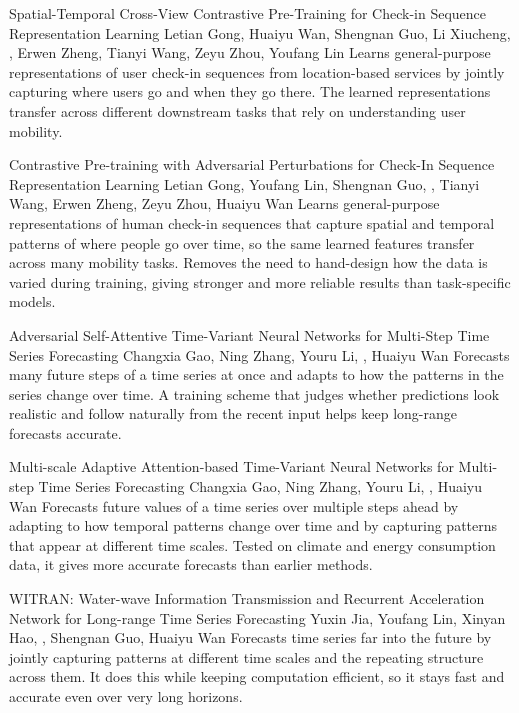 {Spatial-Temporal Cross-View Contrastive Pre-Training for Check-in Sequence Representation Learning}
{Letian Gong, Huaiyu Wan, Shengnan Guo, Li Xiucheng, \me, Erwen Zheng, Tianyi Wang, Zeyu Zhou, Youfang Lin}
{Learns general-purpose representations of user check-in sequences from location-based services by jointly capturing where users go and when they go there. The learned representations transfer across different downstream tasks that rely on understanding user mobility.}

{Contrastive Pre-training with Adversarial Perturbations for Check-In Sequence Representation Learning}
{Letian Gong, Youfang Lin, Shengnan Guo, \me, Tianyi Wang, Erwen Zheng, Zeyu Zhou, Huaiyu Wan}
{Learns general-purpose representations of human check-in sequences that capture spatial and temporal patterns of where people go over time, so the same learned features transfer across many mobility tasks. Removes the need to hand-design how the data is varied during training, giving stronger and more reliable results than task-specific models.}

{Adversarial Self-Attentive Time-Variant Neural Networks for Multi-Step Time Series Forecasting}
{Changxia Gao, Ning Zhang, Youru Li, \me, Huaiyu Wan}
{Forecasts many future steps of a time series at once and adapts to how the patterns in the series change over time. A training scheme that judges whether predictions look realistic and follow naturally from the recent input helps keep long-range forecasts accurate.}

{Multi-scale Adaptive Attention-based Time-Variant Neural Networks for Multi-step Time Series Forecasting}
{Changxia Gao, Ning Zhang, Youru Li, \me, Huaiyu Wan}
{Forecasts future values of a time series over multiple steps ahead by adapting to how temporal patterns change over time and by capturing patterns that appear at different time scales. Tested on climate and energy consumption data, it gives more accurate forecasts than earlier methods.}

{WITRAN: Water-wave Information Transmission and Recurrent Acceleration Network for Long-range Time Series Forecasting}
{Yuxin Jia, Youfang Lin, Xinyan Hao, \me, Shengnan Guo, Huaiyu Wan}
{Forecasts time series far into the future by jointly capturing patterns at different time scales and the repeating structure across them. It does this while keeping computation efficient, so it stays fast and accurate even over very long horizons.}
